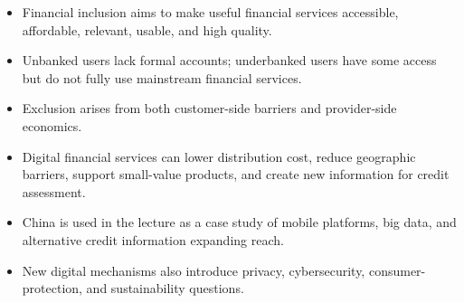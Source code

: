 \begin{chapterrecap}
\begin{itemize}
  \item Financial inclusion aims to make useful financial services accessible, affordable, relevant, usable, and high quality.
  \item Unbanked users lack formal accounts; underbanked users have some access but do not fully use mainstream financial services.
  \item Exclusion arises from both customer-side barriers and provider-side economics.
  \item Digital financial services can lower distribution cost, reduce geographic barriers, support small-value products, and create new information for credit assessment.
  \item China is used in the lecture as a case study of mobile platforms, big data, and alternative credit information expanding reach.
  \item New digital mechanisms also introduce privacy, cybersecurity, consumer-protection, and sustainability questions.
\end{itemize}
\end{chapterrecap}


